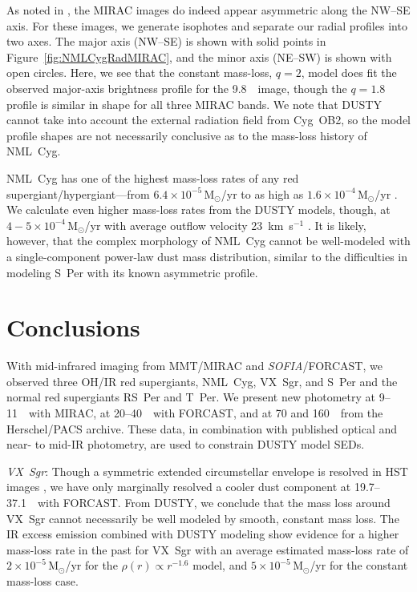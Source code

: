 \documentclass[modern]{aastex61}
\newcommand{\SOFIA}{{\it SOFIA}}
\begin{document}
As noted in \cite{schuster2009}, the MIRAC images do indeed appear asymmetric along the NW--SE axis.  For these images, we generate isophotes and separate our radial profiles into two axes.  The major axis (NW--SE) is shown with solid points in Figure~\ref{fig:NMLCygRadMIRAC}, and the minor axis (NE--SW) is shown with open circles.  Here, we see that the constant mass-loss, $q=2$, model does fit the observed major-axis brightness profile for the 9.8~\micron\ image, though the $q=1.8$ profile is similar in shape for all three MIRAC bands.  We note that DUSTY cannot take into account the external radiation field from Cyg~OB2, so the model profile shapes are not necessarily conclusive as to the mass-loss history of NML~Cyg.

NML~Cyg has one of the highest mass-loss rates of any red supergiant/hypergiant---from $6.4\times10^{-5}\,\mathrm{M}_\odot$/yr \citep{morris1983} to as high as $1.6\times10^{-4}\,\mathrm{M}_\odot$/yr \citep{lucas1992}.  We calculate even higher mass-loss rates from the DUSTY models, though, at $4-5\times10^{-4}\,\mathrm{M}_\odot$/yr with average outflow velocity 23~km~s$^{-1}$ \citep{schuster2009}.  It is likely, however, that the complex morphology of NML~Cyg cannot be well-modeled with a single-component power-law dust mass distribution, similar to the difficulties in modeling S~Per with its known asymmetric profile.


\section{Conclusions}\label{sec:conclusions}
With mid-infrared imaging from MMT/MIRAC and \SOFIA/FORCAST, we observed three OH/IR red supergiants, NML~Cyg, VX~Sgr, and S~Per and the normal red supergiants RS~Per and T~Per.  We present new photometry at 9--11~\micron\ with MIRAC, at 20--40~\micron\ with FORCAST, and at 70 and 160~\micron\ from the Herschel/PACS archive. These data, in combination with published optical and near- to mid-IR photometry, are used to constrain DUSTY model SEDs.

\textit{VX~Sgr}: Though a symmetric extended circumstellar envelope is resolved in HST images \citep{schuster2006}, we have only marginally resolved a cooler dust component at 19.7--37.1~\micron\ with FORCAST. From DUSTY, we conclude that the mass loss around VX~Sgr cannot necessarily be well modeled by smooth, constant mass loss.  The IR excess emission combined with DUSTY modeling show evidence for a higher mass-loss rate in the past for VX~Sgr with an average estimated mass-loss rate of $2\times10^{-5}\,\mathrm{M}_\odot$/yr for the $\rho\left(r\right)\propto r^{-1.6}$ model, and $5\times10^{-5}\,\mathrm{M}_\odot$/yr for the constant mass-loss case.
\end{document}
